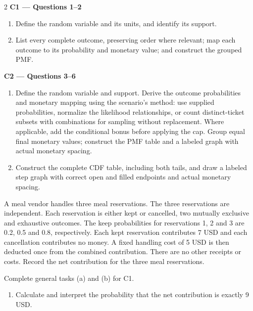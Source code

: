 \begin{multicols*}{2}
\textbf{C1 --- Questions 1--2}
\begin{enumerate}[label=(\alph*)]
\item Define the random variable and its units, and identify its support.
\item List every complete outcome, preserving order where relevant; map each outcome to its probability and monetary value; and construct the grouped PMF.
\end{enumerate}
\noindent\begin{minipage}{\linewidth}
\textbf{C2 --- Questions 3--6}
\begin{enumerate}[label=(\alph*)]
\item Define the random variable and support. Derive the outcome probabilities and monetary mapping using the scenario's method: use supplied probabilities, normalize the likelihood relationships, or count distinct-ticket subsets with combinations for sampling without replacement. Where applicable, add the conditional bonus before applying the cap. Group equal final monetary values; construct the PMF table and a labeled graph with actual monetary spacing.
\item Construct the complete CDF table, including both tails, and draw a labeled step graph with correct open and filled endpoints and actual monetary spacing.
\end{enumerate}
\end{minipage}\par

\noindent\begin{minipage}{\linewidth}
A meal vendor handles three meal reservations. The three reservations are independent. Each reservation is either kept or cancelled, two mutually exclusive and exhaustive outcomes. The keep probabilities for reservations 1, 2 and 3 are 0.2, 0.5 and 0.8, respectively. Each kept reservation contributes 7 USD and each cancellation contributes no money. A fixed handling cost of 5 USD is then deducted once from the combined contribution. There are no other receipts or costs. Record the net contribution for the three meal reservations.

Complete general tasks (a)  and (b)  for C1.
\begin{enumerate}[label=(\alph*),start=3]
\item {} Calculate and interpret the probability that the net contribution is exactly 9 USD.
\end{enumerate}
\end{minipage}\par\medskip


\end{multicols*}
